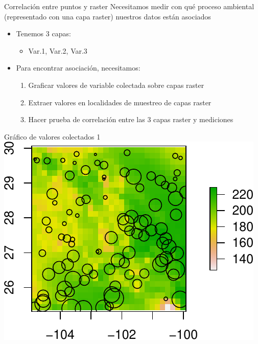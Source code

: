 \documentclass[
  11pt,
  ignorenonframetext,
]{beamer}
\providecommand{\tightlist}{%
  \setlength{\itemsep}{0pt}\setlength{\parskip}{0pt}}
\begin{document}
\begin{frame}{Correlación entre puntos y raster}
\protect\hypertarget{correlaciuxf3n-entre-puntos-y-raster-1}{}
Necesitamos medir con qué proceso ambiental (representado con una capa
raster) nuestros datos están asociados

\begin{itemize}
\item
  Tenemos 3 capas:

  \begin{itemize}
  \tightlist
  \item
    Var.1, Var.2, Var.3
  \end{itemize}
\item
  Para encontrar asociación, necesitamos:

  \begin{enumerate}
  \item
    Graficar valores de variable colectada sobre capas raster
  \item
    Extraer valores en localidades de muestreo de capas raster
  \item
    Hacer prueba de correlación entre las 3 capas raster y mediciones
  \end{enumerate}
\end{itemize}
\end{frame}

\begin{frame}{Gráfico de valores colectados 1}
\protect\hypertarget{gruxe1fico-de-valores-colectados-1}{}
\includegraphics{Correlacion-espacial_files/figure-beamer/unnamed-chunk-8-1.pdf}
\end{frame}
\end{document}
